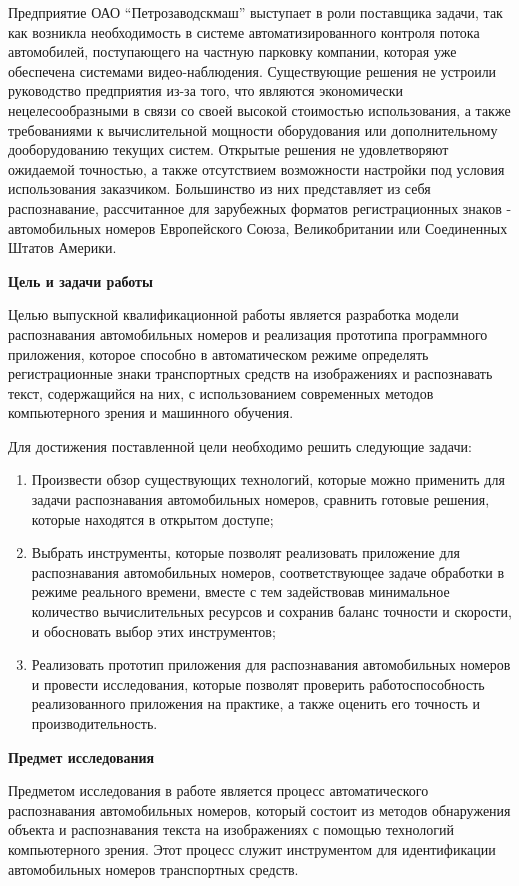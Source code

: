 \documentclass[a4paper,12pt]{article}
\begin{document}
Предприятие ОАО ``Петрозаводскмаш'' выступает в роли поставщика задачи, так как возникла необходимость в системе автоматизированного контроля потока автомобилей, поступающего на частную парковку компании, которая уже обеспечена системами видео-наблюдения.
Существующие решения не устроили руководство предприятия из-за того, что являются экономически нецелесообразными в связи со своей высокой стоимостью использования, а также требованиями к вычислительной мощности оборудования или дополнительному дооборудованию текущих систем. Открытые решения не удовлетворяют ожидаемой точностью, а также отсутствием возможности настройки под условия использования заказчиком. Большинство из них представляет из себя распознавание, рассчитанное для зарубежных форматов регистрационных знаков - автомобильных номеров Европейского Союза, Великобритании или Соединенных Штатов Америки.

\textbf{Цель и задачи работы}

Целью выпускной квалификационной работы является разработка модели распознавания автомобильных номеров и реализация прототипа программного приложения, которое способно в автоматическом режиме определять регистрационные знаки транспортных средств на изображениях и распознавать текст, содержащийся на них, с использованием современных методов компьютерного зрения и машинного обучения.

Для достижения поставленной цели необходимо решить следующие задачи:
\begin{enumerate}
    \item Произвести обзор существующих технологий, которые можно применить для задачи распознавания автомобильных номеров, сравнить готовые решения, которые находятся в открытом доступе;
    \item Выбрать инструменты, которые позволят реализовать приложение для распознавания автомобильных номеров, соответствующее задаче обработки в режиме реального времени, вместе с тем задействовав минимальное количество вычислительных ресурсов и сохранив баланс точности и скорости, и обосновать выбор этих инструментов;
    \item Реализовать прототип приложения для распознавания автомобильных номеров и провести исследования, которые позволят проверить работоспособность реализованного приложения на практике, а также оценить его точность и производительность.
\end{enumerate}

\textbf{Предмет исследования}

Предметом исследования в работе является процесс автоматического распознавания автомобильных номеров, который состоит из методов обнаружения объекта и распознавания текста на изображениях с помощью технологий компьютерного зрения. 
Этот процесс служит инструментом для идентификации автомобильных номеров транспортных средств.
\end{document}
